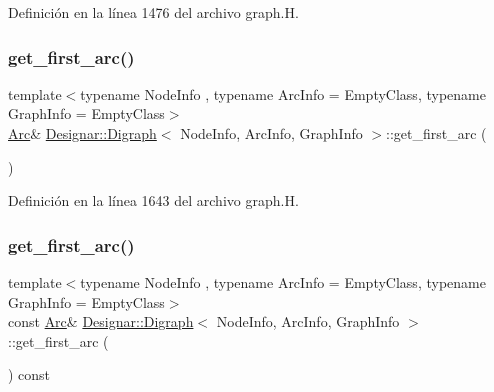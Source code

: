 Definición en la línea 1476 del archivo graph.\+H.

\mbox{\label{class_designar_1_1_digraph_af28c0708f3a09f172e4258772f56a476}} 
\subsubsection{\texorpdfstring{get\+\_\+first\+\_\+arc()}{get\_first\_arc()}\hspace{0.1cm}{\footnotesize\ttfamily [1/2]}}
{\footnotesize\ttfamily template$<$typename Node\+Info , typename Arc\+Info  = Empty\+Class, typename Graph\+Info  = Empty\+Class$>$ \\
\hyperlink{class_designar_1_1_digraph_a0ceb278671f2a535c00fddccdeafd69f}{Arc}\& \hyperlink{class_designar_1_1_digraph}{Designar\+::\+Digraph}$<$ Node\+Info, Arc\+Info, Graph\+Info $>$\+::get\+\_\+first\+\_\+arc (\begin{DoxyParamCaption}{ }\end{DoxyParamCaption})\hspace{0.3cm}{\ttfamily [inline]}}



Definición en la línea 1643 del archivo graph.\+H.

\mbox{\label{class_designar_1_1_digraph_a7842484a51df899e95a65e979d70079c}} 
\subsubsection{\texorpdfstring{get\+\_\+first\+\_\+arc()}{get\_first\_arc()}\hspace{0.1cm}{\footnotesize\ttfamily [2/2]}}
{\footnotesize\ttfamily template$<$typename Node\+Info , typename Arc\+Info  = Empty\+Class, typename Graph\+Info  = Empty\+Class$>$ \\
const \hyperlink{class_designar_1_1_digraph_a0ceb278671f2a535c00fddccdeafd69f}{Arc}\& \hyperlink{class_designar_1_1_digraph}{Designar\+::\+Digraph}$<$ Node\+Info, Arc\+Info, Graph\+Info $>$\+::get\+\_\+first\+\_\+arc (\begin{DoxyParamCaption}{ }\end{DoxyParamCaption}) const\hspace{0.3cm}{\ttfamily [inline]}}



